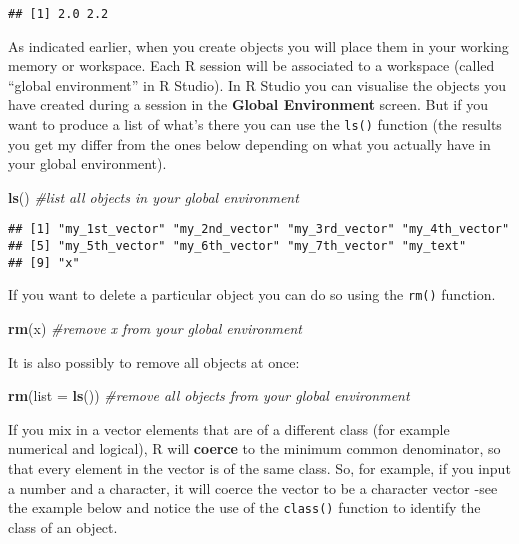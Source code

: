 \documentclass[
]{book}
\newenvironment{Shaded}{\begin{snugshade}}{\end{snugshade}}
\newcommand{\AttributeTok}[1]{\textcolor[rgb]{0.13,0.29,0.53}{#1}}
\newcommand{\CommentTok}[1]{\textcolor[rgb]{0.56,0.35,0.01}{\textit{#1}}}
\newcommand{\FunctionTok}[1]{\textcolor[rgb]{0.13,0.29,0.53}{\textbf{#1}}}
\newcommand{\NormalTok}[1]{#1}
\begin{document}
\begin{verbatim}
## [1] 2.0 2.2
\end{verbatim}

As indicated earlier, when you create objects you will place them in your working memory or workspace. Each R session will be associated to a workspace (called ``global environment'' in R Studio). In R Studio you can visualise the objects you have created during a session in the \textbf{Global Environment} screen. But if you want to produce a list of what's there you can use the \texttt{ls()} function (the results you get my differ from the ones below depending on what you actually have in your global environment).

\begin{Shaded}
\begin{Highlighting}[]
\FunctionTok{ls}\NormalTok{() }\CommentTok{\#list all objects in your global environment}
\end{Highlighting}
\end{Shaded}

\begin{verbatim}
## [1] "my_1st_vector" "my_2nd_vector" "my_3rd_vector" "my_4th_vector"
## [5] "my_5th_vector" "my_6th_vector" "my_7th_vector" "my_text"      
## [9] "x"
\end{verbatim}

If you want to delete a particular object you can do so using the \texttt{rm()} function.

\begin{Shaded}
\begin{Highlighting}[]
\FunctionTok{rm}\NormalTok{(x) }\CommentTok{\#remove x from your global environment}
\end{Highlighting}
\end{Shaded}

It is also possibly to remove all objects at once:

\begin{Shaded}
\begin{Highlighting}[]
\FunctionTok{rm}\NormalTok{(}\AttributeTok{list =} \FunctionTok{ls}\NormalTok{()) }\CommentTok{\#remove all objects from your global environment}
\end{Highlighting}
\end{Shaded}

If you mix in a vector elements that are of a different class (for example numerical and logical), R will \textbf{coerce} to the minimum common denominator, so that every element in the vector is of the same class. So, for example, if you input a number and a character, it will coerce the vector to be a character vector -see the example below and notice the use of the \texttt{class()} function to identify the class of an object.
\end{document}
